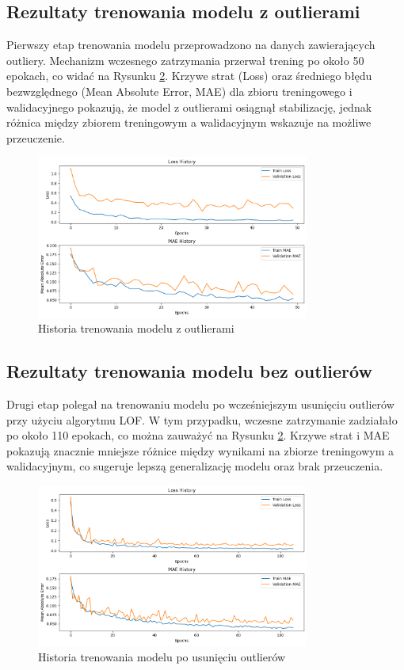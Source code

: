 \documentclass[12pt]{article}
\begin{document}
\subsection{Rezultaty trenowania modelu z outlierami}

Pierwszy etap trenowania modelu przeprowadzono na danych zawierających outliery. Mechanizm wczesnego zatrzymania przerwał trening po około 50 epokach, co widać na Rysunku \ref{fig
}. Krzywe strat (Loss) oraz średniego błędu bezwzględnego (Mean Absolute Error, MAE) dla zbioru treningowego i walidacyjnego pokazują, że model z outlierami osiągnął stabilizację, jednak różnica między zbiorem treningowym a walidacyjnym wskazuje na możliwe przeuczenie.

\begin{figure}[h] \centering \includegraphics[width=0.8\textwidth]{docs/img/training-results-with-outliers.png} \caption{Historia trenowania modelu z outlierami} \label{fig
} \end{figure}

\subsection{Rezultaty trenowania modelu bez outlierów}

Drugi etap polegał na trenowaniu modelu po wcześniejszym usunięciu outlierów przy użyciu algorytmu LOF. W tym przypadku, wczesne zatrzymanie zadziałało po około 110 epokach, co można zauważyć na Rysunku \ref{fig
}. Krzywe strat i MAE pokazują znacznie mniejsze różnice między wynikami na zbiorze treningowym a walidacyjnym, co sugeruje lepszą generalizację modelu oraz brak przeuczenia.

\begin{figure}[h] \centering \includegraphics[width=0.8\textwidth]{docs/img/training-results-without-outliers.png} \caption{Historia trenowania modelu po usunięciu outlierów} \label{fig
} \end{figure}
\end{document}

